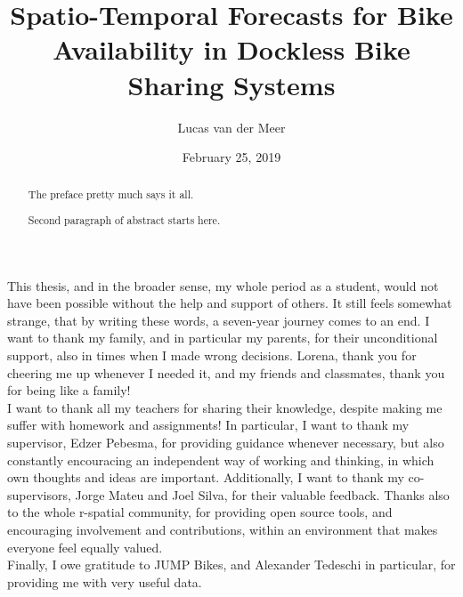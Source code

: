 \documentclass[12pt,oneside]{reedthesis}
\title{Spatio-Temporal Forecasts for Bike Availability in Dockless Bike Sharing
Systems}
\author{Lucas van der Meer}
\date{February 25, 2019}
\begin{document}
  \maketitle

\frontmatter %
\pagestyle{empty} %
  \begin{acknowledgements}
    This thesis, and in the broader sense, my whole period as a student,
    would not have been possible without the help and support of others. It
    still feels somewhat strange, that by writing these words, a seven-year
    journey comes to an end. I want to thank my family, and in particular my
    parents, for their unconditional support, also in times when I made
    wrong decisions. Lorena, thank you for cheering me up whenever I needed
    it, and my friends and classmates, thank you for being like a family!\\
    I want to thank all my teachers for sharing their knowledge, despite
    making me suffer with homework and assignments! In particular, I want to
    thank my supervisor, Edzer Pebesma, for providing guidance whenever
    necessary, but also constantly encouracing an independent way of working
    and thinking, in which own thoughts and ideas are important.
    Additionally, I want to thank my co-supervisors, Jorge Mateu and Joel
    Silva, for their valuable feedback. Thanks also to the whole r-spatial
    community, for providing open source tools, and encouraging involvement
    and contributions, within an environment that makes everyone feel
    equally valued.\\
    Finally, I owe gratitude to JUMP Bikes, and Alexander Tedeschi in
    particular, for providing me with very useful data.
  \end{acknowledgements}

  \hypersetup{linkcolor=black}
  \setcounter{tocdepth}{4}
  \tableofcontents

  \listoftables

  \listoffigures
  \begin{abstract}
    The preface pretty much says it all. \par
    
    Second paragraph of abstract starts here.
  \end{abstract}

\mainmatter %
\pagestyle{fancyplain} %
\end{document}

